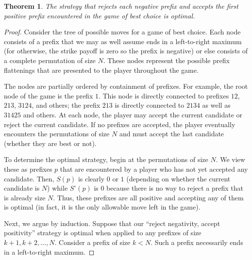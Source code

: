 \documentclass[11pt]{amsart}   %
\newtheorem{theorem}{Theorem}[section]
\theoremstyle{definition}
\theoremstyle{remark}
\numberwithin{equation}{section}
\theoremstyle{theorem}
\begin{document}
\begin{theorem}\label{t:rnap}
The strategy that rejects each negative prefix and accepts the first positive
prefix encountered in the game of best choice is optimal.
\end{theorem}
\begin{proof}
Consider the tree of possible moves for a game of best choice.  Each node
consists of a prefix that we may as well assume ends in a left-to-right maximum
(for otherwise, the strike payoff is zero so the prefix is negative) or else
consists of a complete permutation of size $N$.  These nodes represent the
possible prefix flattenings that are presented to the player throughout the
game.

The nodes are partially ordered by containment of prefixes.  For example, the
root node of the game is the prefix $1$.  This node is directly connected to
prefixes $12$, $213$, $3124$, and others; the prefix $213$ is directly
connected to $2134$ as well as $31425$ and others.  At each node, the player
may accept the current candidate or reject the current candidate.  If no
prefixes are accepted, the player eventually encounters the permutations of
size $N$ and must accept the last candidate (whether they are best or not).

To determine the optimal strategy, begin at the permutations of size $N$.  We
view these as prefixes $p$ that are encountered by a player who has not yet
accepted any candidate.  Then, $S(p)$ is clearly $0$ or $1$ (depending on
whether the current candidate is $N$) while $S^\circ(p)$ is $0$ because there
is no way to reject a prefix that is already size $N$.  Thus, these prefixes
are all positive and accepting any of them is optimal (in fact, it is the
only allowable move left in the game).

Next, we argue by induction.  Suppose that our ``reject negativity, accept
positivity'' strategy is optimal when applied to any prefixes of size $k+1,
k+2, \ldots, N$.  Consider a prefix of size $k < N$.  Such a prefix necessarily
ends in a left-to-right maximum.


\end{proof}
\end{document}
